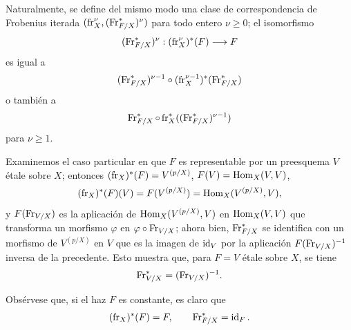 Naturalmente, se define del mismo modo una clase de correspondencia de Frobenius iterada $(\operatorname{fr}_X^\nu,(\operatorname{Fr}^*_{F/X})^\nu)$ para todo entero $\nu\geq0$; el isomorfismo
\[
(\operatorname{Fr}^*_{F/X})^\nu:(\operatorname{fr}_X^\nu)^*(F)\longrightarrow F
\]
es igual a
\[
(\operatorname{Fr}^*_{F/X})^{\nu-1}\circ (\operatorname{fr}_X^{\nu-1})^*(\operatorname{Fr}^*_{F/X})
\]
o también a
\[
\operatorname{Fr}^*_{F/X}\circ\operatorname{fr}_X^*((\operatorname{Fr}^*_{F/X})^{\nu-1})
\]
para $\nu\geq1$.

Examinemos el caso particular en que $F$ es representable por un preesquema $V$ étale sobre $X$; entonces $(\operatorname{fr}_X)^*(F)=V^{(p/X)}$, $F(V)=\operatorname{Hom}_X(V,V)$,
\[
(\operatorname{fr}_X)^*(F)(V)=F(V^{(p/X)})=\operatorname{Hom}_X(V^{(p/X)},V),
\]
y $F(\operatorname{Fr}_{V/X})$ es la aplicación de $\operatorname{Hom}_X(V^{(p/X)},V)$ en $\operatorname{Hom}_X(V,V)$ que transforma un morfismo $\varphi$ en $\varphi\circ\operatorname{Fr}_{V/X}$; ahora bien, $\operatorname{Fr}^*_{F/X}$ se identifica con un morfismo de $V^{(p/X)}$ en $V$ que es la imagen de $\operatorname{id}_V$ por la aplicación $F(\operatorname{Fr}_{V/X})^{-1}$ inversa de la precedente. Esto muestra que, para $F=V$ étale sobre $X$, se tiene
\[
\operatorname{Fr}^*_{V/X}=(\operatorname{Fr}_{V/X})^{-1}.
\]

Obsérvese que, si el haz $F$ es constante, es claro que
\[
(\operatorname{fr}_X)^*(F)=F,
\qquad
\operatorname{Fr}^*_{F/X}=\operatorname{id}_F.
\]
